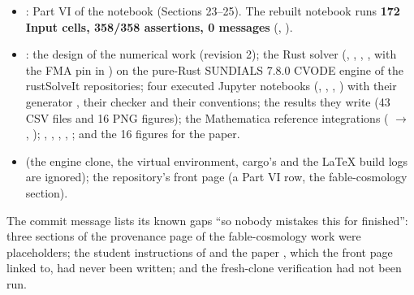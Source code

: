 \begin{itemize}
  \item {}: Part VI of the notebook (Sections 23--25). The rebuilt notebook runs \textbf{172 Input cells, 358/358 assertions, 0 messages} (, ).
  \item {}: the design of the numerical work (revision 2); the Rust solver  (, , , , with the FMA pin in ) on the pure-Rust SUNDIALS 7.8.0 CVODE engine of the rustSolveIt repositories; four executed Jupyter notebooks (, , , ) with their generator , their checker  and their conventions; the results they write (43 CSV files and 16 PNG figures); the Mathematica reference integrations ( $\to$ , ); , , , , ; and the 16 figures for the paper.
  \item {} (the engine clone, the virtual environment, cargo's  and the LaTeX build logs are ignored); the repository's front page (a Part VI row, the fable-cosmology section).
\end{itemize}

The commit message lists its known gaps ``so nobody mistakes this for finished'': three sections of the provenance page of the fable-cosmology work were placeholders; the student instructions of  and the paper , which the front page linked to, had never been written; and the fresh-clone verification had not been run.

